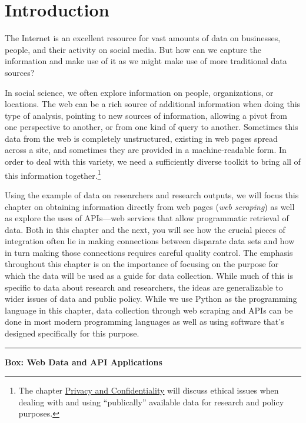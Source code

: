 \documentclass[]{krantz}
\begin{document}
\section{Introduction}\label{introduction}

The Internet is an excellent resource for vast amounts of data on
businesses, people, and their activity on social media. But how can we
capture the information and make use of it as we might make use of more
traditional data sources?

In social science, we often explore information on people,
organizations, or locations. The web can be a rich source of additional
information when doing this type of analysis, pointing to new sources of
information, allowing a pivot from one perspective to another, or from
one kind of query to another. Sometimes this data from the web is
completely unstructured, existing in web pages spread across a site, and
sometimes they are provided in a machine-readable form. In order to deal
with this variety, we need a sufficiently diverse toolkit to bring all
of this information together.\footnote{The chapter
  \protect\hyperlink{chap:privacy}{Privacy and Confidentiality} will
  discuss ethical issues when dealing with and using ``publically''
  available data for research and policy purposes.}

Using the example of data on researchers and research outputs, we will
focus this chapter on obtaining information directly from web pages
(\emph{web scraping}) as well as explore the uses of APIs---web services
that allow programmatic retrieval of data. Both in this chapter and the
next, you will see how the crucial pieces of integration often lie in
making connections between disparate data sets and how in turn making
those connections requires careful quality control. The emphasis
throughout this chapter is on the importance of focusing on the purpose
for which the data will be used as a guide for data collection. While
much of this is specific to data about research and researchers, the
ideas are generalizable to wider issues of data and public policy. While
we use Python as the programming language in this chapter, data
collection through web scraping and APIs can be done in most modern
programming languages as well as using software that's designed
specifically for this purpose.

\begin{center}\rule{0.5\linewidth}{\linethickness}\end{center}

\textbf{Box: Web Data and API Applications}
\end{document}

